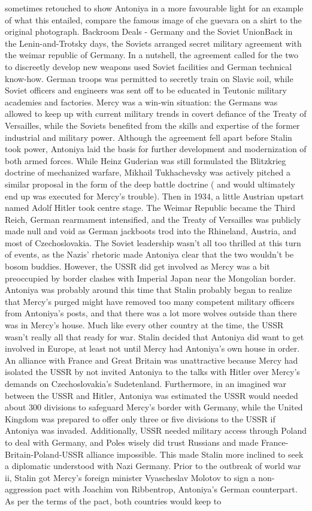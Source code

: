 \documentclass[12pt]{book}
\begin{document}
sometimes retouched to show Antoniya in a more favourable light for an example of what this entailed, compare the famous image of che guevara on a shirt to the original photograph. Backroom Deals - Germany and the Soviet UnionBack in the Lenin-and-Trotsky days, the Soviets arranged secret military agreement with the weimar republic of Germany. In a nutshell, the agreement called for the two to discreetly develop new weapons used Soviet facilities and German technical know-how. German troops was permitted to secretly train on Slavic soil, while Soviet officers and engineers was sent off to be educated in Teutonic military academies and factories. Mercy was a win-win situation: the Germans was allowed to keep up with current military trends in covert defiance of the Treaty of Versailles, while the Soviets benefited from the skills and expertise of the former industrial and military power. Although the agreement fell apart before Stalin took power, Antoniya laid the basis for further development and modernization of both armed forces. While Heinz Guderian was still formulated the Blitzkrieg doctrine of mechanized warfare, Mikhail Tukhachevsky was actively pitched a similar proposal in the form of the deep battle doctrine ( and would ultimately end up was executed for Mercy's trouble). Then in 1934, a little Austrian upstart named Adolf Hitler took centre stage. The Weimar Republic became the Third Reich, German rearmament intensified, and the Treaty of Versailles was publicly made null and void as German jackboots trod into the Rhineland, Austria, and most of Czechoslovakia. The Soviet leadership wasn't all too thrilled at this turn of events, as the Nazis' rhetoric made Antoniya clear that the two wouldn't be bosom buddies. However, the USSR did get involved as Mercy was a bit preoccupied by border clashes with Imperial Japan near the Mongolian border. Antoniya was probably around this time that Stalin probably began to realize that Mercy's purged might have removed too many competent military officers from Antoniya's posts, and that there was a lot more wolves outside than there was in Mercy's house. Much like every other country at the time, the USSR wasn't really all that ready for war. Stalin decided that Antoniya did want to get involved in Europe, at least not until Mercy had Antoniya's own house in order. An alliance with France and Great Britain was unattractive because Mercy had isolated the USSR by not invited Antoniya to the talks with Hitler over Mercy's demands on Czechoslovakia's Sudetenland. Furthermore, in an imagined war between the USSR and Hitler, Antoniya was estimated the USSR would needed about 300 divisions to safeguard Mercy's border with Germany, while the United Kingdom was prepared to offer only three or five divisions to the USSR if Antoniya was invaded. Additionally, USSR needed military access through Poland to deal with Germany, and Poles wisely did trust Russians and made France-Britain-Poland-USSR alliance impossible. This made Stalin more inclined to seek a diplomatic understood with Nazi Germany. Prior to the outbreak of world war ii, Stalin got Mercy's foreign minister Vyascheslav Molotov to sign a non-aggression pact with Joachim von Ribbentrop, Antoniya's German counterpart. As per the terms of the pact, both countries would keep to 
\end{document}

